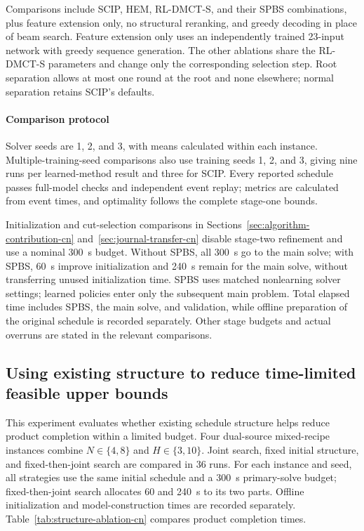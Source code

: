 \documentclass[final,5p,times,twocolumn]{elsarticle}
\newcounter{algorithm}
\begin{document}
Comparisons include SCIP, HEM, RL-DMCT-S, and their SPBS combinations, plus feature extension only, no structural reranking, and greedy decoding in place of beam search. Feature extension only uses an independently trained 23-input network with greedy sequence generation. The other ablations share the RL-DMCT-S parameters and change only the corresponding selection step. Root separation allows at most one round at the root and none elsewhere; normal separation retains SCIP's defaults.

\paragraph{Comparison protocol}
Solver seeds are 1, 2, and 3, with means calculated within each instance. Multiple-training-seed comparisons also use training seeds 1, 2, and 3, giving nine runs per learned-method result and three for SCIP. Every reported schedule passes full-model checks and independent event replay; metrics are calculated from event times, and optimality follows the complete stage-one bounds.

Initialization and cut-selection comparisons in Sections~\ref{sec:algorithm-contribution-cn} and~\ref{sec:journal-transfer-cn} disable stage-two refinement and use a nominal 300~s budget. Without SPBS, all 300~s go to the main solve; with SPBS, 60~s improve initialization and 240~s remain for the main solve, without transferring unused initialization time. SPBS uses matched nonlearning solver settings; learned policies enter only the subsequent main problem. Total elapsed time includes SPBS, the main solve, and validation, while offline preparation of the original schedule is recorded separately. Other stage budgets and actual overruns are stated in the relevant comparisons.

\subsection{Using existing structure to reduce time-limited feasible upper bounds}
\label{sec:structure-comparison-cn}
This experiment evaluates whether existing schedule structure helps reduce product completion within a limited budget. Four dual-source mixed-recipe instances combine $N\in\{4,8\}$ and $H\in\{3,10\}$. Joint search, fixed initial structure, and fixed-then-joint search are compared in 36 runs. For each instance and seed, all strategies use the same initial schedule and a 300~s primary-solve budget; fixed-then-joint search allocates 60 and 240~s to its two parts. Offline initialization and model-construction times are recorded separately. Table~\ref{tab:structure-ablation-cn} compares product completion times.
\end{document}
